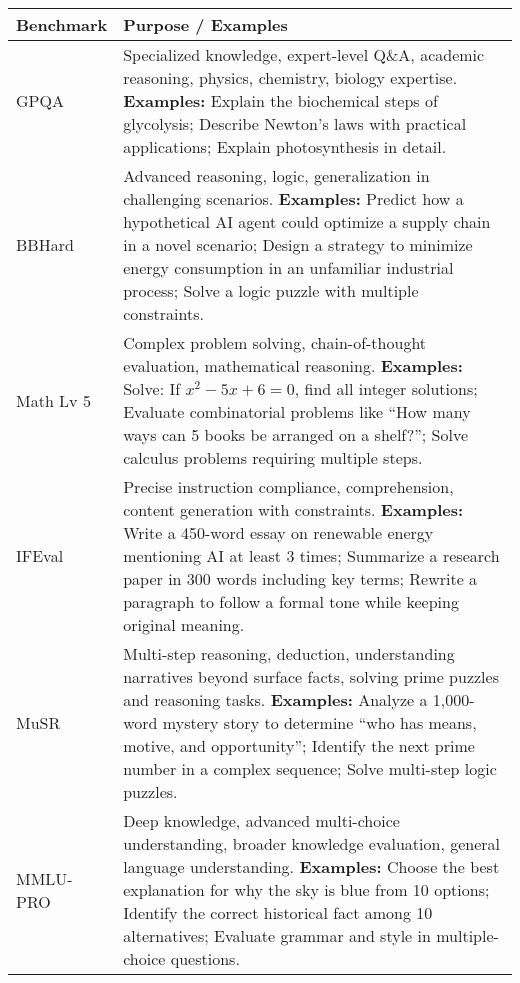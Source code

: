 \documentclass[a4paper, 12pt]{article}
\begin{document}
\begin{tabularx}{\textwidth}{|>{\hsize=0.15\hsize}X|>{\hsize=0.85\hsize}X|}
\hline
\textbf{Benchmark} & \textbf{Purpose / Examples} \\
\hline
GPQA & Specialized knowledge, expert-level Q\&A, academic reasoning, physics, chemistry, biology expertise.  \newline
\textbf{Examples:} Explain the biochemical steps of glycolysis; Describe Newton’s laws with practical applications; Explain photosynthesis in detail. \\
\hline
BBHard & Advanced reasoning, logic, generalization in challenging scenarios.  \newline
\textbf{Examples:} Predict how a hypothetical AI agent could optimize a supply chain in a novel scenario; Design a strategy to minimize energy consumption in an unfamiliar industrial process; Solve a logic puzzle with multiple constraints. \\
\hline
Math Lv 5 & Complex problem solving, chain-of-thought evaluation, mathematical reasoning.  \newline
\textbf{Examples:} Solve: If \(x^2 - 5x + 6 = 0\), find all integer solutions; Evaluate combinatorial problems like “How many ways can 5 books be arranged on a shelf?”; Solve calculus problems requiring multiple steps. \\
\hline
IFEval & Precise instruction compliance, comprehension, content generation with constraints.  \newline
\textbf{Examples:} Write a 450-word essay on renewable energy mentioning AI at least 3 times; Summarize a research paper in 300 words including key terms; Rewrite a paragraph to follow a formal tone while keeping original meaning. \\
\hline
MuSR & Multi-step reasoning, deduction, understanding narratives beyond surface facts, solving prime puzzles and reasoning tasks.  \newline
\textbf{Examples:} Analyze a 1,000-word mystery story to determine “who has means, motive, and opportunity”; Identify the next prime number in a complex sequence; Solve multi-step logic puzzles. \\
\hline
MMLU-PRO & Deep knowledge, advanced multi-choice understanding, broader knowledge evaluation, general language understanding.  \newline
\textbf{Examples:} Choose the best explanation for why the sky is blue from 10 options; Identify the correct historical fact among 10 alternatives; Evaluate grammar and style in multiple-choice questions. \\
\hline
\end{tabularx}
\end{document}
